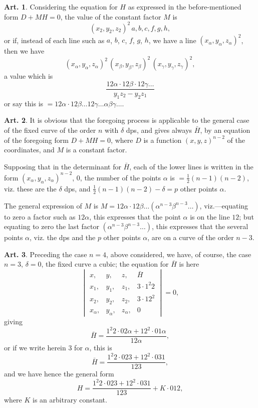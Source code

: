 \documentclass[12pt,a4paper]{article}
\theoremstyle{definition}
\newtheorem{art}{Art.}[section]
\begin{document}
\begin{art}\label{art:46}
Considering the equation for $H$ as expressed in the before-mentioned form $D + MH = 0$, the value of the constant factor $M$ is
\[
(x_2, y_2, z_2)^2\, a, b, c, f, g, h,
\]
or if, instead of each line such as $a$, $b$, $c$, $f$, $g$, $h$, we have a line $(x_\alpha, y_\alpha, z_\alpha)^2$, then we have
\[
(x_\alpha, y_\alpha, z_\alpha)^2\, (x_\beta, y_\beta, z_\beta)^2\, (x_\gamma, y_\gamma, z_\gamma)^2,
\]
a value which is
\[
\frac{12\alpha \cdot 12\beta \cdot 12\gamma \ldots}{y_1 z_2 - y_2 z_1}
\]
or say this is $= 12\alpha \cdot 12\beta \ldots 12\gamma \ldots \alpha\beta\gamma\ldots$.
\end{art}

\begin{art}\label{art:47}
It is obvious that the foregoing process is applicable to the general case of the fixed curve of the order $n$ with $\delta$ dps, and gives always $\bar{H}$, by an equation of the foregoing form $D + MH = 0$, where $D$ is a function $(x, y, z)^{n-2}$ of the coordinates, and $M$ is a constant factor.

Supposing that in the determinant for $\bar{H}$, each of the lower lines is written in the form $(x_\alpha, y_\alpha, z_\alpha)^{n-2}$, $0$, the number of the points $\alpha$ is $= \frac{1}{2}(n-1)(n-2)$, viz. these are the $\delta$ dps, and $\frac{1}{2}(n-1)(n-2) - \delta = p$ other points $\alpha$.

The general expression of $M$ is $M = 12\alpha \cdot 12\beta \ldots (\alpha^{n-3}\beta^{n-3}\ldots)$, viz.---equating to zero a factor such as $12\alpha$, this expresses that the point $\alpha$ is on the line $12$; but equating to zero the last factor $(\alpha^{n-3}\beta^{n-3}\ldots)$, this expresses that the several points $\alpha$, viz. the dps and the $p$ other points $\alpha$, are on a curve of the order $n-3$.
\end{art}

\newpage
\begin{art}\label{art:48}
Preceding the case $n = 4$, above considered, we have, of course, the case $n = 3$, $\delta = 0$, the fixed curve a cubic; the equation for $\bar{H}$ is here
\[
\begin{vmatrix}
x, & y, & z, & \bar{H} \\
x_1, & y_1, & z_1, & 3 \cdot 1^2 2 \\
x_2, & y_2, & z_2, & 3 \cdot 12^2 \\
x_\alpha, & y_\alpha, & z_\alpha, & 0
\end{vmatrix} = 0,
\]
giving
\[
\bar{H} = \frac{1^2 2 \cdot 02\alpha + 12^2 \cdot 01\alpha}{12\alpha},
\]
or if we write herein $3$ for $\alpha$, this is
\[
\bar{H} = \frac{1^2 2 \cdot 023 + 12^2 \cdot 031}{123},
\]
and we have hence the general form
\[
H = \frac{1^2 2 \cdot 023 + 12^2 \cdot 031}{123} + K \cdot 012,
\]
where $K$ is an arbitrary constant.
\end{art}
\end{document}
